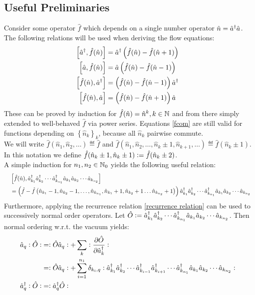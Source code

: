 \subsection{Useful Preliminaries}
Consider some operator $\hat f$ which depends on a single number operator $\hat n=\hat a^\dagger\hat a$. The following relations will be used when deriving the flow equations:
\begin{subequations}
\label{fcom}
\begin{align}
\left[\hat a^\dagger,\hat f(\hat n) \right] &= \hat a^\dagger\left(\hat f(\hat n)-\hat f(\hat n+1)\right)\\ 
\left[\hat a,\hat f(\hat n) \right] &= \hat a\left(\hat f(\hat n)-\hat f(\hat n-1)\right)\\
\left[\hat f(\hat n),\hat a^\dagger \right] &= \left(\hat f(\hat n)-\hat f(\hat n-1)\right)\hat a^\dagger\\
\left[\hat f(\hat n),\hat a \right] &= \left(\hat f(\hat n)-\hat f(\hat n+1)\right)\hat a
\end{align}
\end{subequations}
These can be proved by induction for $\hat f(\hat n)=\hat n^k, k\in\mathbb{N}$ and from there simply extended to well-behaved $\hat f$ via power series. Equations \ref{fcom} are still valid for functions depending on $\left\{\hat n_k\right\}_k$, because all $\hat n_k$ pairwise commute.\\
We will write $\hat f\left(\hat n_1,\hat n_2,\hdots\right)\eqdef \hat f$ and $\hat f\left(\hat n_1,\hat n_2,\hdots,\hat n_k\pm 1,\hat n_{k+1},\hdots\right)\eqdef \hat f(\hat n_k\pm1)$. In this notation we define $\hat f(\hat n_k\pm1,\hat n_{k}\pm1)\vcentcolon=\hat f(\hat n_k\pm2)$.\\
A simple induction for $n_1,n_2\in\mathbb{N}_0$ yields the following useful relation:
\begin{align}
&\left[\hat f(\hat n),\hat a^\dagger_{k_1}\hat a^\dagger_{k_2}\cdots\hat a^\dagger_{k_{n_1}}\hat a_{k_1}\hat a_{k_2}\cdots\hat a_{k_{n_2}} \right] \nonumber \\ \quad& 
= \left(\hat f-\hat f\left(\hat n_{k_1}-1,\hat n_{k_2}-1,\hdots,\hat n_{k_{n_1}},\hat n_{k_1}+1,\hat n_{k_2}+1\hdots\hat n_{k_{n_2}}+1\right)\right)\hat a^\dagger_{k_1}\hat a^\dagger_{k_2}\cdots\hat a^\dagger_{k_{n_1}}\hat a_{k_1}\hat a_{k_2}\cdots\hat a_{k_{n_2}}
\end{align}
Furthermore, applying the recurrence relation \ref{recurrence relation} can be used to successively normal order operators. Let $\hat O\vcentcolon= \hat a^\dagger_{k_1}\hat a^\dagger_{k_2}\cdots\hat a^\dagger_{k_{n_1}}\hat a_{k_1}\hat a_{k_2}\cdots\hat a_{k_{n_2}}$. Then normal ordering w.r.t. the vacuum yields:
\begin{subequations}
\begin{align}
\hat a_q\vcentcolon\hat O\vcentcolon &=\vcentcolon\hat O\hat a_q\vcentcolon + \sum\limits_{k}\vcentcolon \frac{\partial \hat O}{\partial\hat a^\dagger_k}\vcentcolon \nonumber \\
 &= \vcentcolon\hat O\hat a_q\vcentcolon + \sum\limits_{i=1}^{n_1}\delta_{k_i,q}\vcentcolon \hat a^\dagger_{k_1}\hat a^\dagger_{k_2}\cdots\hat a^\dagger_{k_{i-1}}\hat a^\dagger_{k_{i+1}}\cdots\hat a^\dagger_{k_{n_1}}\hat a_{k_1}\hat a_{k_2}\cdots\hat a_{k_{n_2}}\vcentcolon \\
\hat a^\dagger_q\vcentcolon\hat O\vcentcolon &= \vcentcolon \hat a^\dagger_q\hat O\vcentcolon
\end{align}
\end{subequations}
